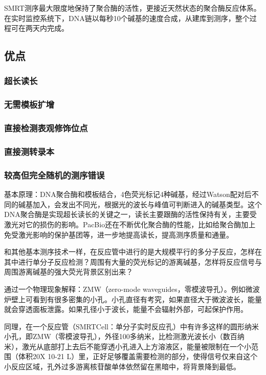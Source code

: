 SMRT测序最大限度地保持了聚合酶的活性，更接近天然状态的聚合酶反应体系。在实时监控系统下，DNA链以每秒10个碱基的速度合成，从建库到测序，整个过程可在两天内完成。

\subsection{优点}

\subsubsection{超长读长}

\subsubsection{无需模板扩增}

\subsubsection{直接检测表观修饰位点}

\subsubsection{直接测转录本}

\subsubsection{较高但完全随机的测序错误}



基本原理：DNA聚合酶和模板结合，4色荧光标记4种碱基，经过Watson配对后不同的碱基加入，会发出不同光，根据光的波长与峰值可判断进入的碱基类型。这个DNA聚合酶是实现超长读长的关键之一，读长主要跟酶的活性保持有关，主要受激光对它的损伤的影响。PacBio还在不断优化聚合酶的性能，比如给聚合酶加上免受激光影响的保护基团等，进一步地提高读长，提高测序质量和通量。

和其他基本测序技术一样，在反应管中进行的是大规模平行的多分子反应，怎样在其中进行单分子反应检测？周围有大量的荧光标记的游离碱基，怎样将反应信号与周围游离碱基的强大荧光背景区别出来？

通过一个物理现象解释：ZMW（zero-mode waveguides，零模波导孔）。例如微波炉壁上可看到有很多密集的小孔。小孔直径有考究，如果直径大于微波波长，能量就会穿透面板泄露。如果孔径小于波长，能量不会辐射外部，可起保护作用。 

同理，在一个反应管（SMRTCell：单分子实时反应孔）中有许多这样的圆形纳米小孔，即ZMW（零模波导孔），外径100多纳米，比检测激光波长小（数百纳米），激光从底部打上去后不能穿透小孔进入上方溶液区，能量被限制在一个小范围（体积20X 10-21 L）里，正好足够覆盖需要检测的部分，使得信号仅来自这个小反应区域，孔外过多游离核苷酸单体依然留在黑暗中，将背景降到最低。


